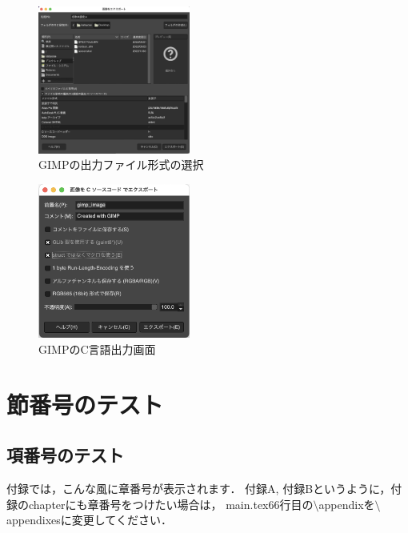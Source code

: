 \begin{figure}[H]
  \begin{center}
    \includegraphics[width=5cm,clip]{figure/gimp1.png}
    \caption{GIMPの出力ファイル形式の選択}
    \label{fig:gimp1}
  \end{center}
\end{figure}


\begin{figure}[H]
  \begin{center}
    \includegraphics[width=5cm,clip]{figure/gimp2.png}
    \caption{GIMPのC言語出力画面}
    \label{fig:gimp1}
  \end{center}
\end{figure}


\section{節番号のテスト}
\subsection{項番号のテスト}
付録では，こんな風に章番号が表示されます．
付録A, 付録Bというように，付録のchapterにも章番号をつけたい場合は，
main.tex66行目の$\setminus$appendixを$\setminus$appendixesに変更してください．


